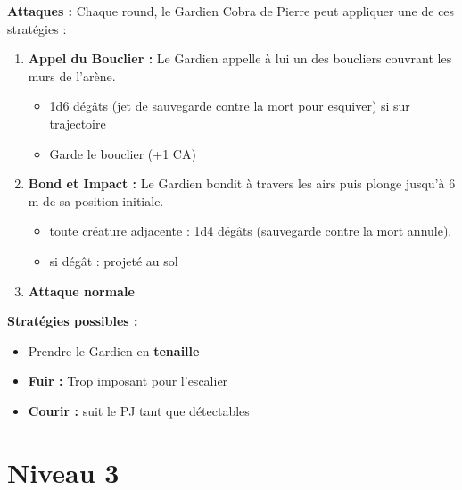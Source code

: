 \textbf{Attaques :} Chaque round, le Gardien Cobra de Pierre peut
appliquer une de ces stratégies :
\begin{enumerate}
  \item \textbf{Appel du Bouclier :} 
  Le Gardien appelle à lui un des boucliers couvrant les murs de l’arène.
  \begin{itemize}
    \item 1d6 dégâts (jet de sauvegarde contre la mort pour esquiver) si sur trajectoire
    \item Garde le bouclier (+1 CA)
  \end{itemize}
  \item \textbf{Bond et Impact :} 
  Le Gardien bondit à travers les airs puis plonge jusqu’à 6 m de sa position initiale.
  \begin{itemize}
    \item toute créature adjacente : 1d4 dégâts (sauvegarde contre la mort annule). 
    \item si dégât : projeté au sol
  \end{itemize}
  \item \textbf{Attaque normale}
\end{enumerate}

\textbf{Stratégies possibles :}
\begin{itemize}
  \item Prendre le Gardien en \textbf{tenaille}
  \item \textbf{Fuir :} Trop imposant pour l'escalier
  \item \textbf{Courir :} suit le PJ tant que détectables
\end{itemize}

\section{Niveau 3}
